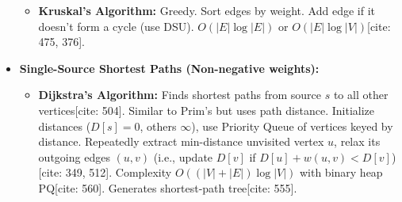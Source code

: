 \documentclass{article}
\begin{document}
\begin{itemize}
\begin{itemize}
              \item \textbf{Kruskal's Algorithm:} Greedy. Sort edges by weight. Add edge if it doesn't form a cycle (use DSU). $O(|E| \log |E|)$ or $O(|E| \log |V|)$[cite: 475, 376].
          \end{itemize}
    \item \textbf{Single-Source Shortest Paths (Non-negative weights):}
          \begin{itemize}
              \item \textbf{Dijkstra's Algorithm:} Finds shortest paths from source $s$ to all other vertices[cite: 504]. Similar to Prim's but uses path distance. Initialize distances ($D[s]=0$, others $\infty$), use Priority Queue of vertices keyed by distance. Repeatedly extract min-distance unvisited vertex $u$, relax its outgoing edges $(u, v)$ (i.e., update $D[v]$ if $D[u] + w(u,v) < D[v]$)[cite: 349, 512]. Complexity $O((|V|+|E|) \log |V|)$ with binary heap PQ[cite: 560]. Generates shortest-path tree[cite: 555].
          \end{itemize}
\end{itemize}
\end{document}
